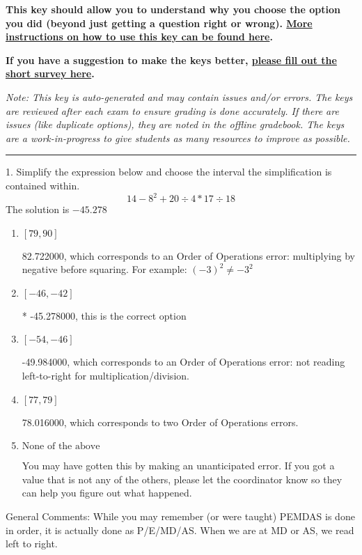 \documentclass{extbook}[14pt]
\begin{document}
\textbf{This key should allow you to understand why you choose the option you did (beyond just getting a question right or wrong). \href{https://xronos.clas.ufl.edu/mac1105spring2020/courseDescriptionAndMisc/Exams/LearningFromResults}{More instructions on how to use this key can be found here}.}

\textbf{If you have a suggestion to make the keys better, \href{https://forms.gle/CZkbZmPbC9XALEE88}{please fill out the short survey here}.}

\textit{Note: This key is auto-generated and may contain issues and/or errors. The keys are reviewed after each exam to ensure grading is done accurately. If there are issues (like duplicate options), they are noted in the offline gradebook. The keys are a work-in-progress to give students as many resources to improve as possible.}

\rule{\textwidth}{0.4pt}

1. Simplify the expression below and choose the interval the simplification is contained within.
\[ 14 - 8^2 + 20 \div 4 * 17 \div 18 \] 
The solution is $ -45.278 $ 

\begin{enumerate}[label=\Alph*.] 
\item $ [79, 90] $ 

  82.722000, which corresponds to an Order of Operations error: multiplying by negative before squaring. For example: $(-3)^2 \neq -3^2$ 
\item $ [-46, -42] $ 

 * -45.278000, this is the correct option 
\item $ [-54, -46] $ 

  -49.984000, which corresponds to an Order of Operations error: not reading left-to-right for multiplication/division. 
\item $ [77, 79] $ 

  78.016000, which corresponds to two Order of Operations errors. 
\item $ \text{None of the above} $ 

  You may have gotten this by making an unanticipated error. If you got a value that is not any of the others, please let the coordinator know so they can help you figure out what happened. 
\end{enumerate} 
 
General Comments: While you may remember (or were taught) PEMDAS is done in order, it is actually done as P/E/MD/AS. When we are at MD or AS, we read left to right.
\end{document}
